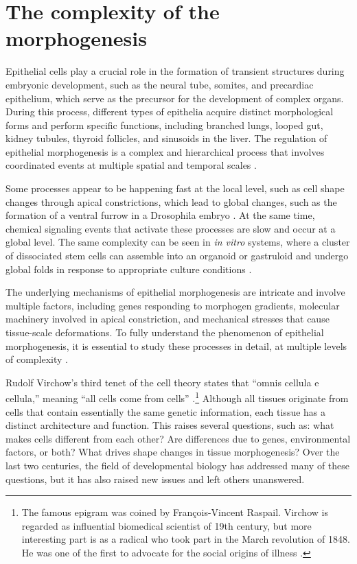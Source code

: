 

\hypertarget{the-complexity-of-the-morphogenesis}{%
\section{The complexity of the
morphogenesis}\label{the-complexity-of-the-morphogenesis}}

Epithelial cells play a crucial role in the formation of transient structures during embryonic development, such as the neural tube, somites, and precardiac epithelium, which serve as the precursor for the development of complex organs. During this process, different types of epithelia acquire distinct morphological forms and perform specific functions, including branched lungs, looped gut, kidney tubules, thyroid follicles, and sinusoids in the liver. The regulation of epithelial morphogenesis is a complex and hierarchical process that involves coordinated events at multiple spatial and temporal scales \cite{trepat2018}.

Some processes appear to be happening fast at the local level, such as cell shape changes through apical constrictions, which lead to global changes, such as the formation of a ventral furrow in a Drosophila embryo \cite{martin2009}. At the same time, chemical signaling events that activate these processes are slow and occur at a global level. The same complexity can be seen in\textit{ in vitro} systems, where a cluster of dissociated stem cells can assemble into an organoid or gastruloid and undergo global folds in response to appropriate culture conditions \cite{collinet2021}.

The underlying mechanisms of epithelial morphogenesis are intricate and involve multiple factors, including genes responding to morphogen gradients, molecular machinery involved in apical constriction, and mechanical stresses that cause tissue-scale deformations. To fully understand the phenomenon of epithelial morphogenesis, it is essential to study these processes in detail, at multiple levels of complexity \cite{schock2002, lecuit2011}.

Rudolf Virchow's third tenet of the cell theory states that ``omnis cellula e cellula,'' meaning ``all cells come from cells'' \cite{virchow1860}.\footnote{The famous epigram was coined by François-Vincent Raspail. Virchow is regarded as influential biomedical scientist of 19th century, but more interesting part is as a radical who took part in the March revolution of 1848. He was one of the first to advocate for the social origins of illness \cite{wright2012, brown2006}.}
Although all tissues originate from cells that contain essentially the same genetic information, each tissue has a distinct architecture and function. This raises several questions, such as: what makes cells different from each other? Are differences due to genes, environmental factors, or both? What drives shape changes in tissue morphogenesis? Over the last two centuries, the field of developmental biology has addressed many of these questions, but it has also raised new issues and left others unanswered.

